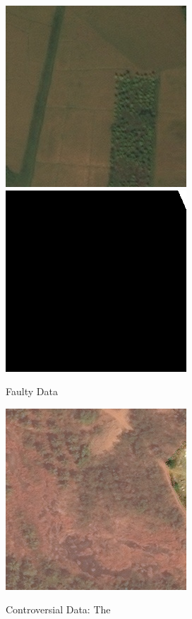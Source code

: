 \begin{figure}
  \begin{center}
  \label{badimg}
  \includegraphics[width=.4\linewidth]{images/satellite_images/1_imag}
  \includegraphics[width=.4\linewidth]{images/satellite_images/1_mask}
  \caption{Faulty Data}
  \end{center}
\end{figure}

\begin{figure}
  \begin{center}
  \label{badimg2}
  \includegraphics[width=.4\linewidth]{images/satellite_images/10_overlap}
  \caption{Controversial Data: The }
  \end{center}
\end{figure}
